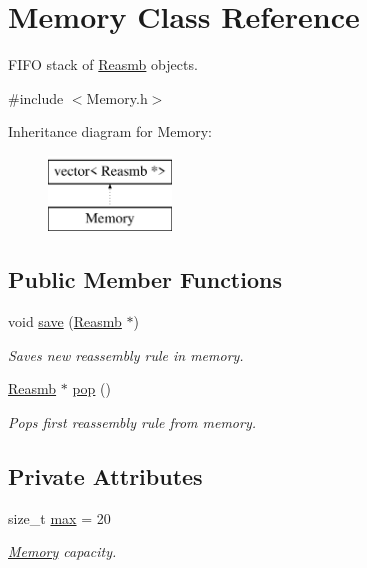 \hypertarget{classMemory}{}\section{Memory Class Reference}
\label{classMemory}


F\+I\+FO stack of \mbox{\hyperlink{classReasmb}{Reasmb}} objects.  




{\ttfamily \#include $<$Memory.\+h$>$}

Inheritance diagram for Memory\+:\begin{figure}[H]
\begin{center}
\leavevmode
\includegraphics[height=2.000000cm]{classMemory}
\end{center}
\end{figure}
\subsection*{Public Member Functions}
\begin{DoxyCompactItemize}
\item 
\mbox{\label{classMemory_a69385c2f0b8711506d38883bdcbdb7ba}} 
void \mbox{\hyperlink{classMemory_a69385c2f0b8711506d38883bdcbdb7ba}{save}} (\mbox{\hyperlink{classReasmb}{Reasmb}} $\ast$)
\begin{DoxyCompactList}\small\item\em Saves new reassembly rule in memory. \end{DoxyCompactList}\item 
\mbox{\label{classMemory_ae10852b620d16e695add6890f9dc298d}} 
\mbox{\hyperlink{classReasmb}{Reasmb}} $\ast$ \mbox{\hyperlink{classMemory_ae10852b620d16e695add6890f9dc298d}{pop}} ()
\begin{DoxyCompactList}\small\item\em Pops first reassembly rule from memory. \end{DoxyCompactList}\end{DoxyCompactItemize}
\subsection*{Private Attributes}
\begin{DoxyCompactItemize}
\item 
\mbox{\label{classMemory_af3c95c183e92e91899dc677c683f2b66}} 
size\+\_\+t \mbox{\hyperlink{classMemory_af3c95c183e92e91899dc677c683f2b66}{max}} = 20
\begin{DoxyCompactList}\small\item\em \mbox{\hyperlink{classMemory}{Memory}} capacity. \end{DoxyCompactList}\end{DoxyCompactItemize}


